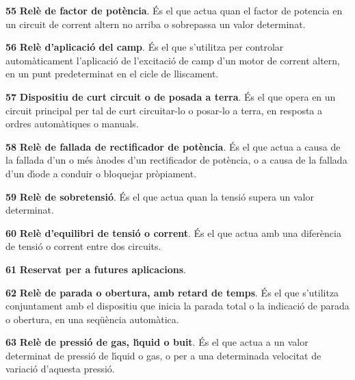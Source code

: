 \begin{multicols}{2}
\begin{list}{}
\item[\textbf{55}]  \textbf{Rel\`{e} de factor de pot\`{e}ncia}.
\'{E}s el que actua quan el factor de potencia en un circuit de corrent altern no arriba o
sobrepassa un valor determinat.

\item[\textbf{56}]  \textbf{Rel\`{e} d'aplicaci\'{o} del camp}.
\'{E}s el que s'utilitza per controlar autom\`{a}ticament l'aplicaci\'{o} de l'excitaci\'{o} de camp d'un
motor de corrent altern, en un punt predeterminat en el cicle de lliscament.

\item[\textbf{57}] 
\textbf{Dispositiu de curt circuit o de posada a terra}. \'{E}s el que
opera en un circuit principal per tal de curt circuitar-lo  o
posar-lo a terra, en resposta a ordres autom\`{a}tiques o manuals.

\item[\textbf{58}]  \textbf{Rel\`{e} de
fallada de rectificador de pot\`{e}ncia}. \'{E}s el que actua a causa de la
fallada d'un o m\'{e}s \`{a}nodes d'un rectificador de pot\`{e}ncia, o a causa
de la fallada d'un d\'{\i}ode a conduir o bloquejar pr\`{o}piament.

\item[\textbf{59}]  \textbf{Rel\`{e} de sobretensi\'{o}}. \'{E}s el que
actua quan la tensi\'{o} supera un valor determinat.

\item[\textbf{60}]  \textbf{Rel\`{e} d'equilibri de
tensi\'{o} o corrent}. \'{E}s el que actua amb una difer\`{e}ncia de tensi\'{o} o
corrent entre dos circuits.

\item[\textbf{61}] \textbf{Reservat per a  futures aplicacions}.

\item[\textbf{62}]  \textbf{Rel\`{e} de
parada o obertura, amb retard de temps}. \'{E}s el que s'utilitza
conjuntament amb el dispositiu que inicia la parada total o la
indicaci\'{o} de parada o obertura, en una seq\"{u}\`{e}ncia autom\`{a}tica.

\item[\textbf{63}]  \textbf{Rel\`{e} de pressi\'{o}
de gas, l\'{\i}quid o buit}. \'{E}s el que actua a un valor determinat de
pressi\'{o} de l\'{\i}quid o gas, o per a una determinada velocitat de
variaci\'{o} d'aquesta pressi\'{o}.


\end{list}
\end{multicols}
